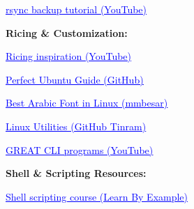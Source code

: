 \documentclass[
  english,
  paper=a4,
  oneside  ,captions=tableheading
]{scrartcl}
\begin{document}
%
  \par\vspace{0.5ex}%
  \href{https://youtu.be/GqSxR93xK6E?si=c2TvpU8R-53SXDty}{\textcolor{blue}{\underline{\faLink\quad rsync backup tutorial (YouTube)}}}%
  \par\vspace{0.5ex}%

\textbf{Ricing \& Customization:}

%
  \par\vspace{0.5ex}%
  \href{https://youtu.be/z1-yuolwrVs?si=3IKioFlYz9L8vkNS}{\textcolor{blue}{\underline{\faLink\quad Ricing inspiration (YouTube)}}}%
  \par\vspace{0.5ex}%

%
  \par\vspace{0.5ex}%
  \href{https://github.com/mikeroyal/Perfect-Ubuntu-Guide}{\textcolor{blue}{\underline{\faLink\quad Perfect Ubuntu Guide (GitHub)}}}%
  \par\vspace{0.5ex}%

%
  \par\vspace{0.5ex}%
  \href{https://mmbesar.github.io/Tutorials/Best-Arabic-Font-in-Linux/}{\textcolor{blue}{\underline{\faLink\quad Best Arabic Font in Linux (mmbesar)}}}%
  \par\vspace{0.5ex}%

%
  \par\vspace{0.5ex}%
  \href{https://github.com/Tinram/Linux-Utilities}{\textcolor{blue}{\underline{\faLink\quad Linux Utilities (GitHub Tinram)}}}%
  \par\vspace{0.5ex}%

%
  \par\vspace{0.5ex}%
  \href{https://youtu.be/nCS4BtJ34-o?si=T6gagbT5k71H5BNE}{\textcolor{blue}{\underline{\faLink{} GREAT CLI programs (YouTube)}}}%
  \par\vspace{0.5ex}%

\textbf{Shell \& Scripting Resources:}

%
  \par\vspace{0.5ex}%
  \href{https://learnbyexample.github.io/scripting\_course/Linux\_curated\_resources.html}{\textcolor{blue}{\underline{\faLink\quad Shell scripting course (Learn By Example)}}}%
  \par\vspace{0.5ex}%
\end{document}
